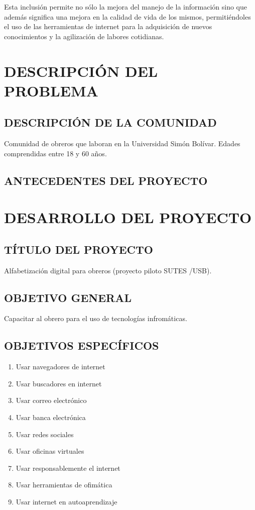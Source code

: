\documentclass[letterpaper,12pt]{article}
\begin{document}
        Esta inclusión permite no sólo la mejora del manejo de la información sino que además significa una mejora en la calidad de vida de los mismos, permitiéndoles el uso de las herramientas de internet para la adquisición de nuevos conocimientos y la agilización de labores cotidianas.
	\pagebreak
	
	\section{DESCRIPCIÓN DEL PROBLEMA}
		\subsection{DESCRIPCIÓN DE LA COMUNIDAD}
			Comunidad de obreros que laboran en la Universidad Simón Bolívar. Edades comprendidas entre 18 y 60 años.
		\subsection{ANTECEDENTES DEL PROYECTO}
	\pagebreak
	
	\section{DESARROLLO DEL PROYECTO}
        \subsection{TÍTULO DEL PROYECTO}
            Alfabetización digital para obreros (proyecto piloto SUTES /USB).
        \subsection{OBJETIVO GENERAL}
            Capacitar al obrero para el uso de tecnologías infromáticas.
            
        \subsection{OBJETIVOS ESPECÍFICOS}
            \begin{enumerate}
                \item Usar navegadores de internet
                \item Usar buscadores en internet
                \item Usar correo electrónico
                \item Usar banca electrónica
                \item Usar redes sociales
                \item Usar oficinas virtuales
                \item Usar responsablemente el internet
                \item Usar herramientas de ofimática
                \item Usar internet en autoaprendizaje
            \end{enumerate}
\end{document}
